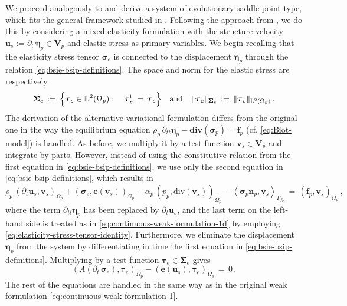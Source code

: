 \documentclass[11pt]{article}
\numberwithin{equation}{section}
\newcommand{\bbeta}{{\boldsymbol\eta}}
\newcommand{\bsi}{{\boldsymbol\sigma}}
\newcommand{\bSigma}{{\boldsymbol\Sigma}}
\newcommand{\btau}{{\boldsymbol\tau}}
\newcommand{\bv}{{\mathbf{v}}}
\newcommand{\f}{\mathbf{f}}
\newcommand{\bu}{\mathbf{u}}
\newcommand{\bn}{{\mathbf{n}}}
\newcommand{\be}{{\mathbf{e}}}
\newcommand{\0}{{\mathbf{0}}}
\def\bV{\mathbf{V}}
\newcommand\bbL{\mathbb{L}}
\def\rt{\mathrm{t}}
\def\bdiv{\mathbf{div}}
\def\div{\mathrm{div}}
\def\pil{\left<}
\def\pir{\right>}
\def\qan{{\quad\hbox{and}\quad}}
\numberwithin{equation}{section}
\begin{document}
We proceed analogously to \cite{aeny2019} and derive a system of evolutionary saddle point type, which fits the general framework studied in \cite{s2010}.
Following the approach from \cite{s2005}, we do this by considering a mixed elasticity formulation with the structure velocity $\bu_s := \partial_t\,\bbeta_p\in \bV_p$ and elastic stress as primary variables.
We begin recalling that the elasticity stress tensor $\bsi_e$ is connected to the displacement $\bbeta_p$ through the relation \eqref{eq:bsie-bsip-definitions}. The space and norm for the elastic stress are respectively
%
\begin{equation*}
\bSigma_e \,:=\, \Big\{ \btau_e\in \bbL^2(\Omega_p) :\quad \btau^\rt_e \,=\, \btau_e \Big\} \qan
\|\btau_e\|_{\bSigma_e} \,:=\, \|\btau_e\|_{\bbL^2(\Omega_p)} \,.
\end{equation*}
%
The derivation of the alternative variational formulation differs from the original one in the way the equilibrium equation $\rho_p\,\partial_{tt}\bbeta_p - \bdiv(\bsi_p) = \f_p$ (cf. \eqref{eq:Biot-model}) is handled.
As before, we multiply it by a test function $\bv_s\in \bV_p$ and integrate by parts.
However, instead of using the constitutive relation from the first equation in \eqref{eq:bsie-bsip-definitions}, we use only the second equation in \eqref{eq:bsie-bsip-definitions}, which results in
\begin{equation*}
\rho_p\,(\partial_t\bu_s,\bv_s)_{\Omega_p} + (\bsi_e, \be(\bv_s))_{\Omega_p} - \alpha_p\,(p_p,\div(\bv_s))_{\Omega_p} - \pil\bsi_p\bn_p, \bv_s\pir_{\Gamma_{fp}} \,=\, (\f_p, \bv_s)_{\Omega_p} \,,
\end{equation*}
where the term $\partial_{tt} \bbeta_p$ has been replaced by $\partial_t \bu_s$, and the last term on the left-hand side is treated as in \eqref{eq:continuous-weak-formulation-1d} by employing \eqref{eq:elasticity-stress-tensor-identity}.
Furthermore, we eliminate the displacement $\bbeta_p$ from the system by differentiating in time the first equation in \eqref{eq:bsie-bsip-definitions}. 
Multiplying by a test function $\btau_e\in \bSigma_e$ gives
%
\begin{equation*}
(A(\partial_t\,\bsi_e), \btau_e)_{\Omega_p} - (\be(\bu_s), \btau_e)_{\Omega_p} \,=\, 0 \,.
\end{equation*}
The rest of the equations are handled in the same way as in the original weak formulation \eqref{eq:continuous-weak-formulation-1}.
\end{document}
